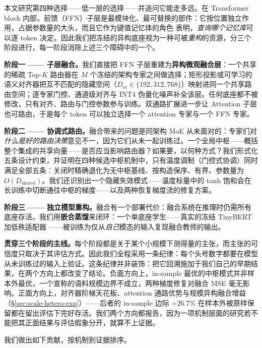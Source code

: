 \documentclass[10pt,twoside]{article}
\theoremstyle{definition}
\theoremstyle{plain}
\theoremstyle{remark}
\begin{document}
本文研究第四种选择——低一层的选择——并追问它能走多远。在 Transformer block 内部，前馈（FFN）子层是最模块化、最可替换的部件：它按位置独立作用，占据参数量的大头，而且它作为键值记忆体的角色 \citep{geva2021} 表明，\emph{查询哪个记忆库}可以逐 token 决定。因此我们把冻结的异构底座视为一种可被\emph{重构}的资源，分三个阶段进行，每一阶段消除上述三个障碍中的一个。

\textbf{阶段一 —— 子层融合。}我们直接把 FFN 子层重建为\textbf{异构微观融合层}：一个共享的稀疏 Top-$K$ 路由器在 $M$ 个冻结的架构专家之间做选择；矩形投影或可学习的语义对齐器把互不匹配的隐藏空间（$D_m \in \{192, 312, 768\}$）映射进同一个共享路由空间；逐专家门控、通道级对齐与 INT4 伪量化噪声补全该层。任何底座都不被修改，只有对齐、路由与门控参数参与训练。双通路扩展进一步让 Attention 子层也可路由，于是每个 token 可以独立选择一个 attention 专家与一个 FFN 专家。

\textbf{阶段二 —— 协调式路由。}融合带来的问题是同架构 MoE 从未面对的：专家们对\emph{什么是好的路由决策}意见不一，因为它们从未一起训练过。一个全局中枢——概括整个集成的共享向量——是否应当影响路由器？如果要，以何种方式？我们形式化五条设计约束，并证明在四种候选中枢机制中，只有温度调制（门控式协调）同时满足全部五条：关闭时精确退化为无中枢基线、按构造保序、有界、参数量为 $O(D_{\text{shared}})$。我们还识别出一个隐藏失效模式——温度标量中的 tanh 饱和会在长训练中切断通往中枢的梯度——以及两种恢复梯度流的修复方案。

\textbf{阶段三 —— 独立模型重构。}融合有一个部署代价：融合系统在推理时仍需所有底座存活。我们用\textbf{嵌合蒸馏}来闭环：一个单底座学生——真实的冻结 TinyBERT \citep{jiao2020} 加低秩适配器 \citep{hu2022}——被训练为仅从\emph{自己}模态的输入复现融合教师的输出。

\textbf{贯穿三个阶段的主线。}每个阶段都是关于某个小规模下测得量的主张，而主张的可信度只取决于其评估方式。因此我们全程采用一条纪律：每个头号数字都要在模型从未训练过的输入上验证。这条纪律并非装饰：把它回溯施加于我们自己的早期结果，在两个方向上都改变了结论。负面方向上，in-sample 最优的中枢模式并非样本外最优，一个宣称的语料规模边界不成立，两种梯度修复对融合 MSE 毫无影响。正面方向上，对齐器阶梯天花板、attention 通路优势与规模异构融合增益（\S\ref{sec:scale-hetero-exp}）——后者的 in-sample 边际 $+26.7\%$ 在样本外被原样保留都在留出评估下完好存活。我们两个方向都报告，因为一项机制层面的研究若不能把其正面结果与评估假象分开，就算不上证据。

我们做出如下贡献，按机制到证据排序。
\end{document}
